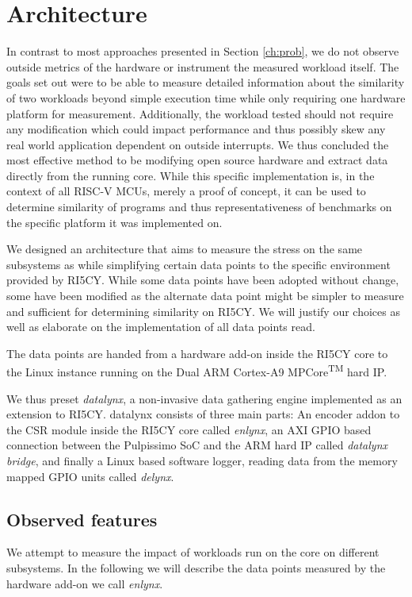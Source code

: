\documentclass[../bachelor_paper.tex]{subfiles}
\begin{document}
\chapter{Architecture}
    \label{ch:arch}
In contrast to most approaches presented in Section \ref{ch:prob}, we do not observe outside metrics of the hardware or instrument the measured workload itself. The goals set out were to be able to measure detailed information about the similarity of two workloads beyond simple execution time while only requiring one hardware platform for measurement. Additionally, the workload tested should not require any modification which could impact performance and thus possibly skew any real world application dependent on outside interrupts. We thus concluded the most effective method to be modifying open source hardware and extract data directly from the running core. While this specific implementation is, in the context of all RISC-V \acp{MCU}, merely a proof of concept, it can be used to determine similarity of programs and thus representativeness of benchmarks on the specific platform it was implemented on.

We designed an architecture that aims to measure the stress on the same subsystems as \cite{phansalkarMeasuringProgramSimilarity2005,joshiMeasuringBenchmarkSimilarity2006,eeckhoutQuantifyingImpactInput} while simplifying certain data points to the specific environment provided by RI5CY. While some data points have been adopted without change, some have been modified as the alternate data point might be simpler to measure and sufficient for determining similarity on RI5CY. We will justify our choices as well as elaborate on the implementation of all data points read.

The data points are handed from a hardware add-on inside the RI5CY core to the Linux instance running on the Dual ARM\textsuperscript{\textregistered} Cortex\textsuperscript{\textregistered}-A9 MPCore\textsuperscript{TM} hard \ac{IP}.

We thus preset \emph{datalynx}, a non-invasive data gathering engine implemented as an extension to RI5CY. datalynx consists of three main parts: An encoder addon to the \ac{CSR} module inside the RI5CY core called \emph{enlynx}, an AXI GPIO based connection between the Pulpissimo \ac{SoC} and the ARM\textsuperscript{\textregistered} hard \ac{IP} called \emph{datalynx bridge}, and finally a Linux based software logger, reading data from the memory mapped GPIO units called \emph{delynx}.

\section{Observed features}
We attempt to measure the impact of workloads run on the core on different subsystems. In the following we will describe the data points measured by the hardware add-on we call \emph{enlynx}.
\end{document}
